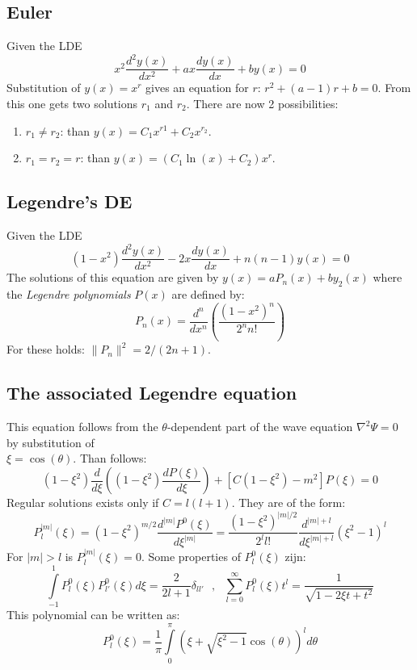 \subsection{Euler}
Given the LDE
\[
x^2\frac{d^2y(x)}{dx^2}+ax\frac{dy(x)}{dx}+by(x)=0
\]
Substitution of $y(x)=x^r$ gives an equation for $r$: $r^2+(a-1)r+b=0$. From
this one gets two solutions $r_1$ and $r_2$. There are now 2 possibilities:
\begin{enumerate}
\item $r_1\neq r_2$: than $y(x)=C_1x^{r1}+C_2x^{r_2}$.
\item $r_1=r_2=r$: than $y(x)=(C_1\ln(x)+C_2)x^r$.
\end{enumerate}

\subsection{Legendre's DE}
Given the LDE
\[
(1-x^2)\frac{d^2y(x)}{dx^2}-2x\frac{dy(x)}{dx}+n(n-1)y(x)=0
\]
The solutions of this equation are given by $y(x)=aP_n(x)+by_2(x)$
where the {\it Legendre polynomials} $P(x)$ are defined by:
\[
P_n(x)=\frac{d^n}{dx^n}\left(\frac{(1-x^2)^n}{2^n n!}\right)
\]
For these holds: $\|P_n\|^2=2/(2n+1)$.

\subsection{The associated Legendre equation}
This equation follows from the $\theta$-dependent part of the wave equation
$\nabla^2\Psi=0$ by substitution of\\ $\xi=\cos(\theta)$. Than follows:
\[
(1-\xi^2)\frac{d}{d\xi}\left((1-\xi^2)\frac{dP(\xi)}{d\xi}\right)+
[C(1-\xi^2)-m^2]P(\xi)=0
\]
Regular solutions exists only if $C=l(l+1)$. They are of the form:
\[
P_l^{|m|}(\xi)=(1-\xi^2)^{m/2}\frac{d^{|m|}P^0(\xi)}{d\xi^{|m|}}=
\frac{(1-\xi^2)^{|m|/2}}{2^ll!}\frac{d^{|m|+l}}{d\xi^{|m|+l}}(\xi^2-1)^l
\]
For $|m|>l$ is $P_l^{|m|}(\xi)=0$.
Some properties of $P_l^0(\xi)$ zijn:
\[
\int\limits_{-1}^1P_l^0(\xi)P_{l'}^0(\xi)d\xi=\frac{2}{2l+1}\delta_{ll'}~~~,~~~
\sum_{l=0}^\infty P_l^0(\xi)t^l=\frac{1}{\sqrt{1-2\xi t+t^2}}
\]
This polynomial can be written as:
\[
P_l^0(\xi)=\frac{1}{\pi}\int\limits_0^\pi(\xi+\sqrt{\xi^2-1}\cos(\theta))^ld\theta
\]

